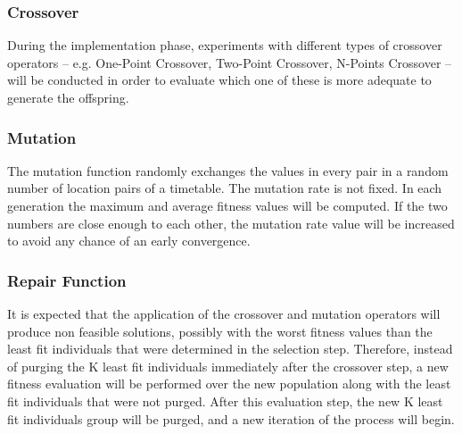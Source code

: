 \subsubsection{Crossover}
\label{subsubsubsec:ga-selection}
During the implementation phase, experiments with different types of crossover operators – e.g. One-Point Crossover, Two-Point Crossover, N-Points Crossover – will be conducted in order to evaluate which one of these is more adequate to generate the offspring.\\
\subsubsection{Mutation}
\label{subsubsubsec:ga-mutation}
The mutation function randomly exchanges the values in every pair in a random number of location pairs of a timetable. The mutation rate is not fixed. In each generation the maximum and average fitness values will be computed. If the two numbers are close enough to each other, the mutation rate value will be increased to avoid any chance of an early convergence.\\
\subsubsection{Repair Function}
\label{subsubsubsec:ga-repairfunction}
It is expected that the application of the crossover and mutation operators  will produce non feasible solutions, possibly with the worst fitness values than the least fit individuals that were determined in the selection step. Therefore, instead of purging the K least fit individuals immediately after the crossover step, a new fitness evaluation will be performed over the new population along with the least fit individuals that were not purged. After this evaluation step, the new K least fit individuals group will be purged, and a new iteration of the process will begin.
